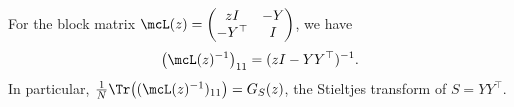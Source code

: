 \begin{lemma}\label{lem:schur}
For the block matrix $\mcL(z) = \begin{pmatrix} zI & -Y \\ -Y^\top & I \end{pmatrix}$, we have
\[
\bigl(\mcL(z)^{-1}\bigr)_{11} = (zI - YY^\top)^{-1}.
\]
In particular, $\frac{1}{N}\Tr\bigl((\mcL(z)^{-1})_{11}\bigr) = G_S(z)$, the Stieltjes transform of $S = YY^\top$.
\end{lemma}

